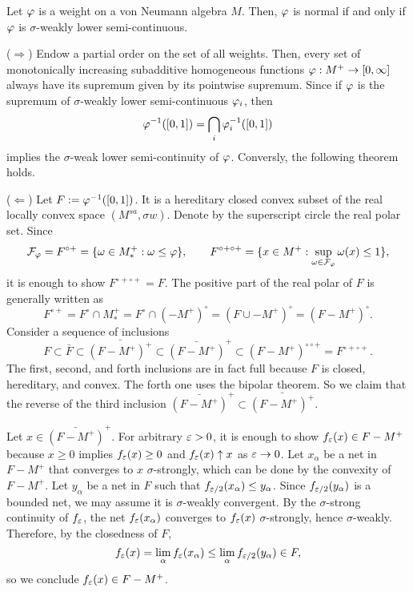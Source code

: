 \documentclass{../../../small}
\begin{document}
\begin{thm}
Let $\varphi$ is a weight on a von Neumann algebra $M$.
Then, $\varphi$ is normal if and only if $\varphi$ is $\sigma$-weakly lower semi-continuous.
\end{thm}
\begin{pf}
($\Rightarrow$)
Endow a partial order on the set of all weights.
Then, every set of monotonically increasing subadditive homogeneous functions $\varphi:M^+\to[0,\infty]$ always have its supremum given by its pointwise supremum.
Since if $\varphi$ is the supremum of $\sigma$-weakly lower semi-continuous $\varphi_i$, then
\[\varphi^{-1}([0,1])=\bigcap_i\varphi_i^{-1}([0,1])\]
implies the $\sigma$-weak lower semi-continuity of $\varphi$.
Conversly, the following theorem holds.

($\Leftarrow$)
Let $F:=\varphi^{-1}([0,1])$.
It is a hereditary closed convex subset of the real locally convex space $(M^{sa},\sigma w)$.
Denote by the superscript circle the real polar set.
Since
\[\mathcal{F}_\varphi=F^{\circ+}=\{\omega\in M_*^+:\omega\le\varphi\},\qquad
F^{\circ+\circ+}=\{x\in M^+:\sup_{\omega\in\mathcal{F}_\varphi}\omega(x)\le1\},\]
it is enough to show $F^{\circ+\circ+}=F$.
The positive part of the real polar of $F$ is generally written as
\[F^{\circ+}=F^\circ\cap M_*^+=F^\circ\cap(-M^+)^\circ=(F\cup-M^+)^\circ=(F-M^+)^\circ.\]
Consider a sequence of inclusions
\[F\subset\bar F\subset\bar{(F-M^+)^+}\subset\bar{(F-M^+)}^+\subset(F-M^+)^{\circ\circ+}=F^{\circ+\circ+}.\]
The first, second, and forth inclusions are in fact full because $F$ is closed, hereditary, and convex.
The forth one uses the bipolar theorem.
So we claim that the reverse of the third inclusion $\bar{(F-M^+)}^+\subset\bar{(F-M^+)^+}$.

Let $x\in\bar{(F-M^+)}^+$.
For arbitrary $\varepsilon>0$, it is enough to show $f_\varepsilon(x)\in F-M^+$ because $x\ge0$ implies $f_\varepsilon(x)\ge0$ and $f_\varepsilon(x)\uparrow x$ as $\varepsilon\to0$.
Let $x_\alpha$ be a net in $F-M^+$ that converges to $x$ $\sigma$-strongly, which can be done by the convexity of $F-M^+$.
Let $y_\alpha$ be a net in $F$ such that $f_{\varepsilon/2}(x_\alpha)\le y_\alpha$.
Since $f_{\varepsilon/2}(y_\alpha)$ is a bounded net, we may assume it is $\sigma$-weakly convergent.
By the $\sigma$-strong continuity of $f_\varepsilon$, the net $f_\varepsilon(x_\alpha)$ converges to $f_\varepsilon(x)$ $\sigma$-strongly, hence $\sigma$-weakly.
Therefore, by the closedness of $F$,
\[f_\varepsilon(x)=\lim_\alpha f_\varepsilon(x_\alpha)\le\lim_\alpha f_{\varepsilon/2}(y_\alpha)\in F,\]
so we conclude $f_\varepsilon(x)\in F-M^+$.
\end{pf}
\end{document}
